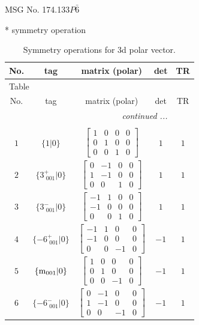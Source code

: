 \documentclass[fleqn,8pt]{jsarticle}
\begin{document}
\setcounter{MaxMatrixCols}{32}

\renewcommand{\tablename}{Table~}
\renewcommand{\figurename}{Figure~}
\begin{center}
\LARGE
MSG No. 174.133\quad$P\bar{6}$
\end{center}
* symmetry operation
\renewcommand{\arraystretch}{1.3}
\begin{longtable}{ccccc}
\caption{Symmetry operations for 3d polar vector.}
 \\
 \hline \hline
No. & tag & matrix (polar) & det & TR \\ \hline \endfirsthead

\multicolumn{4}{l}{\tablename\ \thetable{}} \\
 \hline \hline
No. & tag & matrix (polar) & det & TR \\ \hline \endhead

 \hline \hline
\multicolumn{4}{r}{\footnotesize\it continued ...} \\ \endfoot

 \hline \hline
\multicolumn{4}{r}{} \\ \endlastfoot

$ 1 $ & $ \{1|0\} $ & $ \begin{bmatrix} 1 & 0 & 0 & 0 \\ 0 & 1 & 0 & 0 \\ 0 & 0 & 1 & 0 \end{bmatrix} $ & $ 1 $ & $ 1 $ \\ \hline
$ 2 $ & $ \{3^{+}_{\,\,001}|0\} $ & $ \begin{bmatrix} 0 & -1 & 0 & 0 \\ 1 & -1 & 0 & 0 \\ 0 & 0 & 1 & 0 \end{bmatrix} $ & $ 1 $ & $ 1 $ \\ \hline
$ 3 $ & $ \{3^{-}_{\,\,001}|0\} $ & $ \begin{bmatrix} -1 & 1 & 0 & 0 \\ -1 & 0 & 0 & 0 \\ 0 & 0 & 1 & 0 \end{bmatrix} $ & $ 1 $ & $ 1 $ \\ \hline
$ 4 $ & $ \{-6^{+}_{\,\,001}|0\} $ & $ \begin{bmatrix} -1 & 1 & 0 & 0 \\ -1 & 0 & 0 & 0 \\ 0 & 0 & -1 & 0 \end{bmatrix} $ & $ -1 $ & $ 1 $ \\ \hline
$ 5 $ & $ \{{\rm m}_{001}|0\} $ & $ \begin{bmatrix} 1 & 0 & 0 & 0 \\ 0 & 1 & 0 & 0 \\ 0 & 0 & -1 & 0 \end{bmatrix} $ & $ -1 $ & $ 1 $ \\ \hline
$ 6 $ & $ \{-6^{-}_{\,\,001}|0\} $ & $ \begin{bmatrix} 0 & -1 & 0 & 0 \\ 1 & -1 & 0 & 0 \\ 0 & 0 & -1 & 0 \end{bmatrix} $ & $ -1 $ & $ 1 $ \\
\end{longtable}
\end{document}
